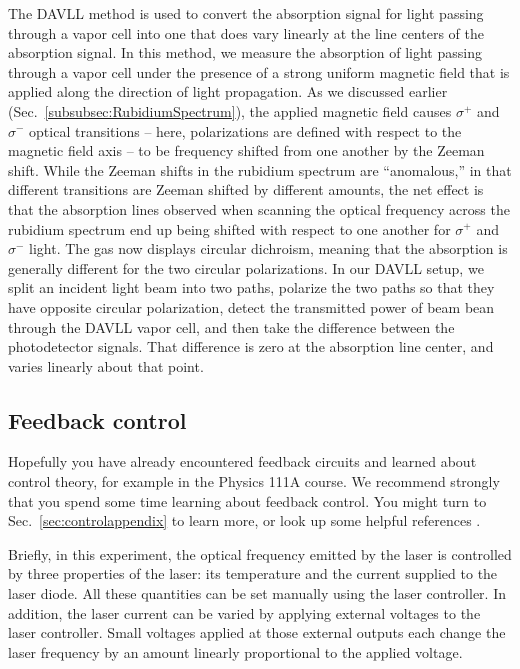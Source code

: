 \documentclass{../lab}
\begin{document}
The DAVLL method is used to convert the absorption signal for light passing through a vapor cell into one that does vary linearly at the line centers of the absorption signal.  In this method, we measure the absorption of light passing through a vapor cell under the presence of a strong uniform magnetic field that is applied along the direction of light propagation.  As we discussed earlier (Sec.\ \ref{subsubsec:RubidiumSpectrum}), the applied magnetic field causes $\sigma^+$ and $\sigma^-$ optical transitions -- here, polarizations are defined with respect to the magnetic field axis -- to be frequency shifted from one another by the Zeeman shift.   While the Zeeman shifts in the rubidium spectrum are ``anomalous,'' in that different transitions are Zeeman shifted by different amounts, the net effect is that the absorption lines observed when scanning the optical frequency across the rubidium spectrum end up being shifted with respect to one another for $\sigma^+$ and $\sigma^-$ light.  The gas now displays circular dichroism, meaning that the absorption is generally different for the two circular polarizations.  In our DAVLL setup, we split an incident light beam into two paths, polarize the two paths so that they have opposite circular polarization, detect the transmitted power of beam bean through the DAVLL vapor cell, and then take the difference between the photodetector signals. That difference is zero at the absorption line center, and varies linearly about that point.

\subsection{Feedback control}
\label{sec:control_abridged}

Hopefully you have already encountered feedback circuits and learned about control theory, for example in the Physics 111A course.  We recommend strongly that you spend some time learning about feedback control.  You might turn to Sec.\ \ref{sec:controlappendix} to learn more, or look up some helpful references \cite{DiStefano,Dorf,Bechhoefer}.

Briefly, in this experiment, the optical frequency emitted by the laser is controlled by three properties of the laser: its temperature and the current supplied to the laser diode.  All these quantities can be set manually using the laser controller.  In addition, the laser current can be varied by applying external voltages to the laser controller.  Small voltages applied at those external outputs each change the laser frequency by an amount linearly proportional to the applied voltage.
\end{document}
